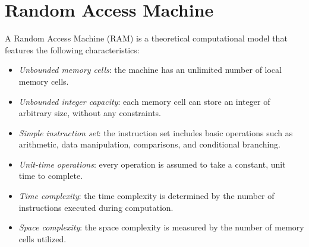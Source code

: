 \section{Random Access Machine}

\begin{definition}
    A Random Access Machine (RAM) is a theoretical computational model that features the following characteristics:
\end{definition}
\begin{itemize}
    \item \textit{Unbounded memory cells}: the machine has an unlimited number of local memory cells.
    \item \textit{Unbounded integer capacity}: each memory cell can store an integer of arbitrary size, without any constraints.
    \item \textit{Simple instruction set}: the instruction set includes basic operations such as arithmetic, data manipulation, comparisons, and conditional branching.
    \item \textit{Unit-time operations}: every operation is assumed to take a constant, unit time to complete.
    \item \textit{Time complexity}: the time complexity is determined by the number of instructions executed during computation.
    \item \textit{Space complexity}: the space complexity is measured by the number of memory cells utilized.
\end{itemize}
